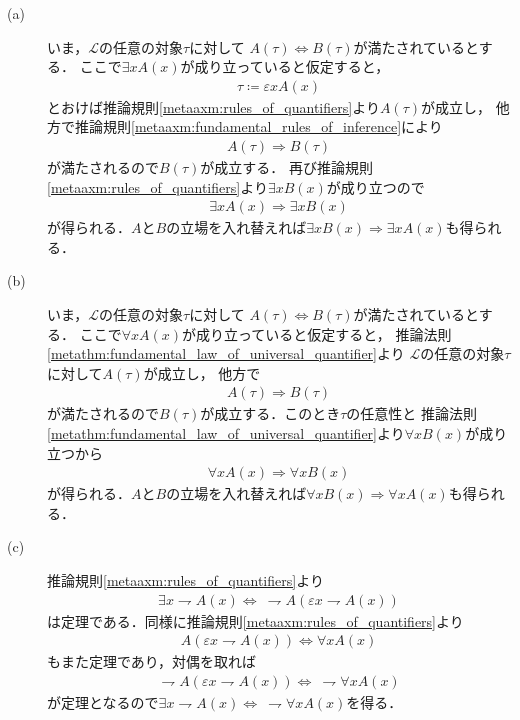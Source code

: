 	\begin{prf}\mbox{}
		\begin{description}
			\item[(a)]
				いま，$\mathcal{L}$の任意の対象$\tau$に対して
				$A(\tau) \Longleftrightarrow B(\tau)$が満たされているとする．
				ここで$\exists x A(x)$が成り立っていると仮定すると，
				\begin{align}
					\tau \coloneqq \varepsilon x A(x)
				\end{align}
				とおけば推論規則\ref{metaaxm:rules_of_quantifiers}より$A(\tau)$が成立し，
				他方で推論規則\ref{metaaxm:fundamental_rules_of_inference}により
				\begin{align}
					A(\tau) \Longrightarrow B(\tau)
				\end{align}
				が満たされるので$B(\tau)$が成立する．
				再び推論規則\ref{metaaxm:rules_of_quantifiers}より$\exists x B(x)$が成り立つので
				\begin{align}
					\exists x A(x) \Longrightarrow \exists x B(x)
				\end{align}
				が得られる．$A$と$B$の立場を入れ替えれば$\exists x B(x) \Longrightarrow \exists x A(x)$も得られる．
				
			\item[(b)]
				いま，$\mathcal{L}$の任意の対象$\tau$に対して
				$A(\tau) \Longleftrightarrow B(\tau)$が満たされているとする．
				ここで$\forall x A(x)$が成り立っていると仮定すると，
				推論法則\ref{metathm:fundamental_law_of_universal_quantifier}より
				$\mathcal{L}$の任意の対象$\tau$に対して$A(\tau)$が成立し，
				他方で
				\begin{align}
					A(\tau) \Longrightarrow B(\tau)
				\end{align}
				が満たされるので$B(\tau)$が成立する．このとき$\tau$の任意性と
				推論法則\ref{metathm:fundamental_law_of_universal_quantifier}より$\forall x B(x)$が成り立つから
				\begin{align}
					\forall x A(x) \Longrightarrow \forall x B(x)
				\end{align}
				が得られる．$A$と$B$の立場を入れ替えれば$\forall x B(x) \Longrightarrow \forall x A(x)$も得られる．
				
			\item[(c)]
				推論規則\ref{metaaxm:rules_of_quantifiers}より
				\begin{align}
					\exists x \rightharpoondown A(x) \Longleftrightarrow\ 
					\rightharpoondown A(\varepsilon x \rightharpoondown A(x))
				\end{align}
				は定理である．同様に推論規則\ref{metaaxm:rules_of_quantifiers}より
				\begin{align}
					A(\varepsilon x \rightharpoondown A(x)) \Longleftrightarrow \forall x A(x) 
				\end{align}
				もまた定理であり，対偶を取れば
				\begin{align}
					\rightharpoondown A(\varepsilon x \rightharpoondown A(x)) \Longleftrightarrow\ 
					\rightharpoondown \forall x A(x)
				\end{align}
				が定理となるので$\exists x \rightharpoondown A(x) \Longleftrightarrow\ \rightharpoondown \forall x A(x)$を得る．
			

\end{description}
\end{prf}
